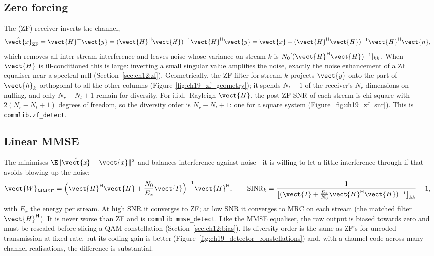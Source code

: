 \subsection{Zero forcing}

The  (ZF) receiver inverts the channel,
\begin{equation}
\hat{\vect{x}}_{\text{ZF}}=\vect{H}^{+}\vect{y}=(\vect{H}^{\mathsf H}\vect{H})^{-1}\vect{H}^{\mathsf H}\vect{y}
=\vect{x}+(\vect{H}^{\mathsf H}\vect{H})^{-1}\vect{H}^{\mathsf H}\vect{n},
\end{equation}
which removes all inter-stream interference and leaves noise whose variance on stream $k$ is
$N_0[(\vect{H}^{\mathsf H}\vect{H})^{-1}]_{kk}$. When $\vect{H}$ is ill-conditioned this is large:
inverting a small singular value amplifies the noise, exactly the noise enhancement of a ZF
equaliser near a spectral null (Section~\ref{sec:ch12:zf}). Geometrically, the ZF filter for stream
$k$ projects $\vect{y}$ onto the part of $\vect{h}_k$ orthogonal to all the other columns
(Figure~\ref{fig:ch19_zf_geometry}); it spends $N_t-1$ of the receiver's $N_r$ dimensions on
nulling, and only $N_r-N_t+1$ remain for diversity. For i.i.d.\ Rayleigh $\vect{H}$, the post-ZF
SNR of each stream is chi-square with $2(N_r-N_t+1)$ degrees of freedom, so the diversity order is
$N_r-N_t+1$: one for a square system (Figure~\ref{fig:ch19_zf_snr}). This is
\texttt{commlib.zf\_detect}.

\subsection{Linear MMSE}

The  minimises $\E\|\hat{\vect{x}}-\vect{x}\|^2$ and balances interference
against noise---it is willing to let a little interference through if that avoids blowing up the
noise:
\begin{equation}
\vect{W}_{\text{MMSE}}=\Big(\vect{H}^{\mathsf H}\vect{H}+\frac{N_0}{E_x}\vect{I}\Big)^{-1}\vect{H}^{\mathsf H},
\qquad
\text{SINR}_k=\frac{1}{\big[(\vect{I}+\tfrac{E_x}{N_0}\vect{H}^{\mathsf H}\vect{H})^{-1}\big]_{kk}}-1,
\label{eq:ch19:mmse}
\end{equation}
with $E_x$ the energy per stream. At high SNR it converges to ZF; at low SNR it converges to MRC
on each stream (the matched filter $\vect{H}^{\mathsf H}$). It is never worse than ZF and is
\texttt{commlib.mmse\_detect}. Like the MMSE equaliser, the raw output is biased towards zero and
must be rescaled before slicing a QAM constellation (Section~\ref{sec:ch12:bias}). Its diversity
order is the same as ZF's for uncoded transmission at fixed rate, but its coding gain is better
(Figure~\ref{fig:ch19_detector_constellations}) and, with a channel code across many channel
realisations, the difference is substantial.

